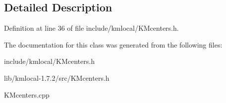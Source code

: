 \subsection{Detailed Description}


Definition at line 36 of file include/kmlocal/KMcenters.h.



The documentation for this class was generated from the following files:\begin{DoxyCompactItemize}
\item 
include/kmlocal/KMcenters.h\item 
lib/kmlocal-\/1.7.2/src/KMcenters.h\item 
KMcenters.cpp\end{DoxyCompactItemize}
